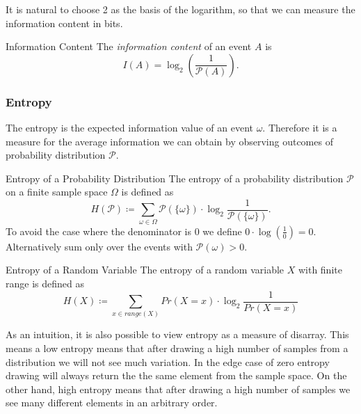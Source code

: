 \documentclass[english]{panikzettel}
\begin{document}
It is natural to choose 2 as the basis of the logarithm, so that we can measure the information content in bits.

\begin{defi}{Information Content}
The \emph{information content} of an event $A$ is
\[
I(A)=\log_2 \left(\frac{1}{\mathcal{P}(A)}\right).
\]
\end{defi}



\subsubsection{Entropy}
The entropy is the expected information value of an event $\omega$. Therefore it is a measure for the average information we can obtain by observing outcomes of probability distribution $\mathcal{P}$.

\begin{halfboxl}
\vspace{-\baselineskip}
\begin{defi}{Entropy of a Probability Distribution}
The entropy of a probability distribution $\mathcal{P}$ on a finite sample space $\Omega$ is defined as
\[
H(\mathcal{P})\coloneqq \sum_{\omega\in\Omega}\mathcal{P}(\{\omega \})\cdot \log_2\frac{1}{\mathcal{P}(\{\omega \})}.
\]
To avoid the case where the denominator is 0 we define $0\cdot \log (\frac{1}{0})=0$. Alternatively sum only over the events with $\mathcal{P}(\omega)>0$.
\end{defi}
\end{halfboxl}
\begin{halfboxr}
\vspace{-\baselineskip}
\begin{defi}{Entropy of a Random Variable}
The entropy of a random variable $X$ with finite range is defined as
{\small{}
\[
H(X)\coloneqq \sum_{x\in range(X)}Pr(X=x)\cdot\log_2 \frac{1}{Pr(X=x)}
\]}
\end{defi}
\end{halfboxr}

As an intuition, it is also possible to view entropy as a measure of disarray. This means a low entropy means that after drawing a high number of samples from a distribution we will not see much variation. In the edge case of zero entropy drawing will always return the the same element from the sample space. On the other hand, high entropy means that after drawing a high number of samples we see many different elements in an arbitrary order.

\end{document}
